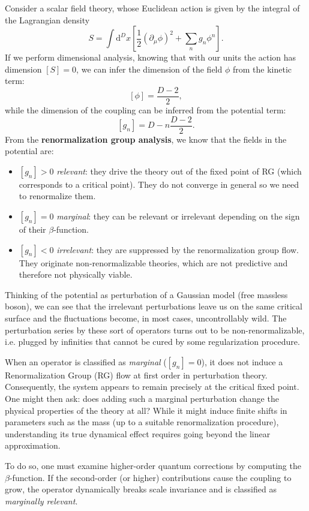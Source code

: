 Consider a scalar field theory, whose Euclidean action is given by the integral of the Lagrangian density
\begin{equation}
    S = \int \mathrm{d}^{D}x\left[\frac{1}{2}(\partial_{\mu}\phi)^{2}+\sum_{n}g_{n}\phi^{n}\right].
    \label{eq:scalar_field_action}
\end{equation}
If we perform dimensional analysis, knowing that with our units the action has dimension \([S]=0\), we can infer the dimension of the field \(\phi\) from the kinetic term:
\[
    [\phi]=\frac{D-2}{2},
\]
while the dimension of the coupling can be inferred from the potential term:
\[
    [g_{n}]=D-n\frac{D-2}{2}.
\]
From the \textbf{renormalization group analysis}, we know that the fields in the potential are:
\begin{itemize}
    \item \([g_{n}]>0\) \textit{relevant}: they drive the theory out of the fixed point of RG (which corresponds to a critical point). They do not converge in general so we need to renormalize them.
    \item \([g_{n}]=0\) \textit{marginal}: they can be relevant or irrelevant depending on the sign of their \(\beta\)-function.
    \item \([g_{n}]<0\) \textit{irrelevant}: they are suppressed by the renormalization group flow. They originate non-renormalizable theories, which are not predictive and therefore not physically viable.
\end{itemize}
Thinking of the potential as perturbation of a Gaussian model (free massless boson), we can see that the irrelevant perturbations leave us on the same critical surface and the fluctuations become, in most cases, uncontrollably wild.
The perturbation series by these sort of operators turns out to be non-renormalizable, i.e. plugged by infinities that cannot be cured by some regularization procedure.

When an operator is classified as \textit{marginal} (\([g_{n}] = 0\)), it does not induce a Renormalization Group (RG) flow at first order in perturbation theory. Consequently, the system appears to remain precisely at the critical fixed point. One might then ask: does adding such a marginal perturbation change the physical properties of the theory at all? While it might induce finite shifts in parameters such as the mass (up to a suitable renormalization procedure), understanding its true dynamical effect requires going beyond the linear approximation.

To do so, one must examine higher-order quantum corrections by computing the \(\beta\)-function. If the second-order (or higher) contributions cause the coupling to grow, the operator dynamically breaks scale invariance and is classified as \textit{marginally relevant}.

